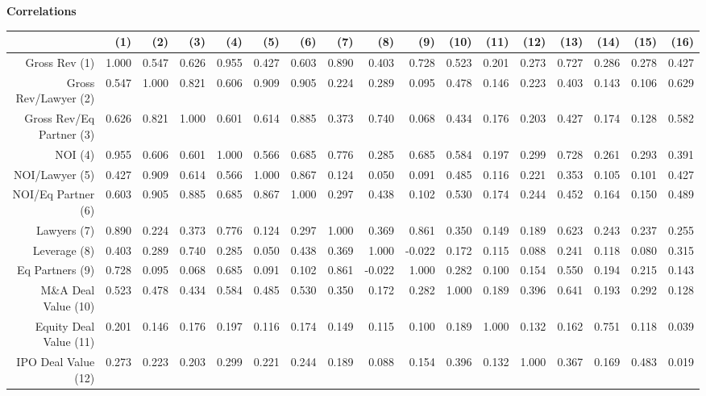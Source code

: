 \documentclass{article}
\begin{document}
\newpage
{\large \textbf{Correlations} }%
\begin{table}[H]
\centering
\begin{tabular}{rrrrrrrrrrrrrrrrr}
  \hline
 & (1) & (2) & (3) & (4) & (5) & (6) & (7) & (8) & (9) & (10) & (11) & (12) & (13) & (14) & (15) & (16) \\
  \hline
Gross Rev (1) & 1.000 & 0.547 & 0.626 & 0.955 & 0.427 & 0.603 & 0.890 & 0.403 & 0.728 & 0.523 & 0.201 & 0.273 & 0.727 & 0.286 & 0.278 & 0.427 \\
  Gross Rev/Lawyer (2) & 0.547 & 1.000 & 0.821 & 0.606 & 0.909 & 0.905 & 0.224 & 0.289 & 0.095 & 0.478 & 0.146 & 0.223 & 0.403 & 0.143 & 0.106 & 0.629 \\
  Gross Rev/Eq Partner (3) & 0.626 & 0.821 & 1.000 & 0.601 & 0.614 & 0.885 & 0.373 & 0.740 & 0.068 & 0.434 & 0.176 & 0.203 & 0.427 & 0.174 & 0.128 & 0.582 \\
  NOI (4) & 0.955 & 0.606 & 0.601 & 1.000 & 0.566 & 0.685 & 0.776 & 0.285 & 0.685 & 0.584 & 0.197 & 0.299 & 0.728 & 0.261 & 0.293 & 0.391 \\
  NOI/Lawyer (5) & 0.427 & 0.909 & 0.614 & 0.566 & 1.000 & 0.867 & 0.124 & 0.050 & 0.091 & 0.485 & 0.116 & 0.221 & 0.353 & 0.105 & 0.101 & 0.427 \\
  NOI/Eq Partner (6) & 0.603 & 0.905 & 0.885 & 0.685 & 0.867 & 1.000 & 0.297 & 0.438 & 0.102 & 0.530 & 0.174 & 0.244 & 0.452 & 0.164 & 0.150 & 0.489 \\
  Lawyers (7) & 0.890 & 0.224 & 0.373 & 0.776 & 0.124 & 0.297 & 1.000 & 0.369 & 0.861 & 0.350 & 0.149 & 0.189 & 0.623 & 0.243 & 0.237 & 0.255 \\
  Leverage (8) & 0.403 & 0.289 & 0.740 & 0.285 & 0.050 & 0.438 & 0.369 & 1.000 & -0.022 & 0.172 & 0.115 & 0.088 & 0.241 & 0.118 & 0.080 & 0.315 \\
  Eq Partners (9) & 0.728 & 0.095 & 0.068 & 0.685 & 0.091 & 0.102 & 0.861 & -0.022 & 1.000 & 0.282 & 0.100 & 0.154 & 0.550 & 0.194 & 0.215 & 0.143 \\
  M\&A Deal Value (10) & 0.523 & 0.478 & 0.434 & 0.584 & 0.485 & 0.530 & 0.350 & 0.172 & 0.282 & 1.000 & 0.189 & 0.396 & 0.641 & 0.193 & 0.292 & 0.128 \\
  Equity Deal Value (11) & 0.201 & 0.146 & 0.176 & 0.197 & 0.116 & 0.174 & 0.149 & 0.115 & 0.100 & 0.189 & 1.000 & 0.132 & 0.162 & 0.751 & 0.118 & 0.039 \\
  IPO Deal Value (12) & 0.273 & 0.223 & 0.203 & 0.299 & 0.221 & 0.244 & 0.189 & 0.088 & 0.154 & 0.396 & 0.132 & 1.000 & 0.367 & 0.169 & 0.483 & 0.019 \\

\end{tabular}
\end{table}
\end{document}
